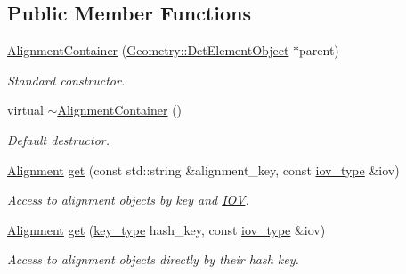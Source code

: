 \subsection*{Public Member Functions}
\begin{DoxyCompactItemize}
\item 
\hyperlink{class_d_d4hep_1_1_alignments_1_1_interna_1_1_alignment_container_a360f49ea724e7c446c8b81adfbac8c85}{Alignment\+Container} (\hyperlink{class_d_d4hep_1_1_geometry_1_1_det_element_object}{Geometry\+::\+Det\+Element\+Object} $\ast$parent)
\begin{DoxyCompactList}\small\item\em Standard constructor. \end{DoxyCompactList}\item 
virtual \hyperlink{class_d_d4hep_1_1_alignments_1_1_interna_1_1_alignment_container_ab3390799871933e6408bbe0c0ff41444}{$\sim$\+Alignment\+Container} ()
\begin{DoxyCompactList}\small\item\em Default destructor. \end{DoxyCompactList}\item 
\hyperlink{class_d_d4hep_1_1_alignments_1_1_alignment}{Alignment} \hyperlink{class_d_d4hep_1_1_alignments_1_1_interna_1_1_alignment_container_a94c052115a69265deef948ded2c96e8a}{get} (const std\+::string \&alignment\+\_\+key, const \hyperlink{class_d_d4hep_1_1_alignments_1_1_interna_1_1_alignment_container_a99b2a8d269ecefcf1b59269ad94e75e3}{iov\+\_\+type} \&iov)
\begin{DoxyCompactList}\small\item\em Access to alignment objects by key and \hyperlink{class_d_d4hep_1_1_i_o_v}{I\+OV}. \end{DoxyCompactList}\item 
\hyperlink{class_d_d4hep_1_1_alignments_1_1_alignment}{Alignment} \hyperlink{class_d_d4hep_1_1_alignments_1_1_interna_1_1_alignment_container_af87ee43a853d77f00ba6ed6902f3b717}{get} (\hyperlink{class_d_d4hep_1_1_alignments_1_1_interna_1_1_alignment_container_a7395f0e25d9e524d2a2bd7df0f4364e6}{key\+\_\+type} hash\+\_\+key, const \hyperlink{class_d_d4hep_1_1_alignments_1_1_interna_1_1_alignment_container_a99b2a8d269ecefcf1b59269ad94e75e3}{iov\+\_\+type} \&iov)
\begin{DoxyCompactList}\small\item\em Access to alignment objects directly by their hash key. \end{DoxyCompactList}\item 

\end{DoxyCompactItemize}
